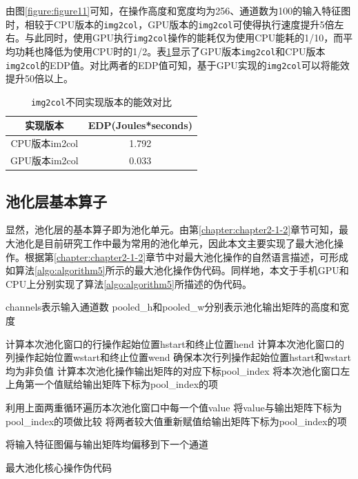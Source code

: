 由图\ref{figure:figure11}可知，在操作高度和宽度均为256、通道数为100的输入特征图时，相较于CPU版本的\texttt{img2col}，GPU版本的\texttt{img2col}可使得执行速度提升5倍左右。与此同时，使用GPU执行\texttt{img2col}操作的能耗仅为使用CPU能耗的1/10，而平均功耗也降低为使用CPU时的1/2。表\ref{table:table2}显示了GPU版本\texttt{img2col}和CPU版本\texttt{img2col}的EDP值。对比两者的EDP值可知，基于GPU实现的\texttt{img2col}可以将能效提升50倍以上。

\begin{table}[htbp]
  \centering
  \caption{\texttt{img2col}不同实现版本的能效对比}
  \label{table:table2}
  \begin{tabular}{cc}
    \toprule
      实现版本 & EDP(Joules*seconds) \\
    \midrule
      CPU版本im2col & 1.792 \\
      GPU版本im2col & 0.033 \\
    \bottomrule
  \end{tabular}
\end{table}


\subsection{池化层基本算子}

显然，池化层的基本算子即为池化单元。由第\ref{chapter:chapter2-1-2}章节可知，最大池化是目前研究工作中最为常用的池化单元，因此本文主要实现了最大池化操作。根据第\ref{chapter:chapter2-1-2}章节中对最大池化操作的自然语言描述，可形成如算法\ref{algo:algorithm5}所示的最大池化操作伪代码。同样地，本文于手机GPU和CPU上分别实现了算法\ref{algo:algorithm5}所描述的伪代码。

\begin{algorithm}[htbp]
  \small
  \SetAlgoLined
    \begin{spacing}{0.8}
    channels表示输入通道数\;
    pooled\_h和pooled\_w分别表示池化输出矩阵的高度和宽度\;
     {
         {
             {
                计算本次池化窗口的行操作起始位置hstart和终止位置hend\;
                计算本次池化窗口的列操作起始位置wstart和终止位置wend\;
                确保本次行列操作起始位置hstart和wstart均为非负值\;
                计算本次池化操作输出矩阵的对应下标pool\_index\;
                将本次池化窗口左上角第一个值赋给输出矩阵下标为pool\_index的项\;

                 {
                     {
                      利用上面两重循环遍历本次池化窗口中每一个值value\;
                        将value与输出矩阵下标为pool\_index的项做比较\;
                      将两者较大值重新赋值给输出矩阵下标为pool\_index的项\;
                    }
                }
            }
        }
        将输入特征图偏与输出矩阵均偏移到下一个通道\;
    }
    \end{spacing}
  \caption{最大池化核心操作伪代码}
  \label{algo:algorithm5}
\end{algorithm}

